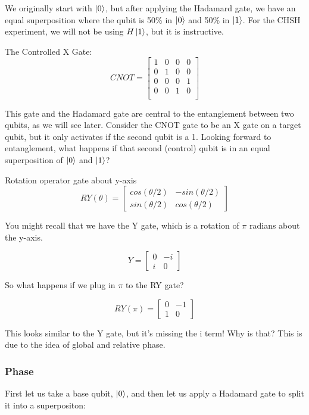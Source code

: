 \documentclass[12pt]{article}
\begin{document}
We originally start with $\ket{0}$, but after applying the Hadamard gate, we have an equal superposition where the qubit is 50\% in $\ket{0}$ and 50\% in $\ket{1}$. For the CHSH experiment, we will not be using $H\ket{1}$, but it is instructive. %


The Controlled X Gate:
$$
CNOT =
\begin{bmatrix}
1 &  0  &  0  & 0 \\
0 &  1  &  0  & 0 \\
0 &  0  &  0  & 1 \\
0 &  0  &  1  & 0 \\
\end{bmatrix}
$$

This gate and the Hadamard gate are central to the entanglement between two qubits, as we will see later. Consider the CNOT gate to be an X gate on a target qubit, but it only activates if the second qubit is a 1. Looking forward to entanglement, what happens if that second (control) qubit is in an equal superposition of $\ket{0}$ and $\ket{1}$?

Rotation operator gate about y-axis 
$$
RY(\theta) =
\begin{bmatrix}
cos(\theta / 2) & -sin(\theta / 2) \\
sin(\theta / 2) &  cos(\theta / 2)
\end{bmatrix}
$$

You might recall that we have the Y gate, which is a rotation of $\pi$ radians about the y-axis.

$$
Y = \begin{bmatrix}
0 & -i \\
i & 0
\end{bmatrix}
$$

So what happens if we plug in $\pi$ to the RY gate?

$$
RY(\pi) =
\begin{bmatrix}
0 & -1 \\
1 &  0
\end{bmatrix}
$$

This looks similar to the Y gate, but it's missing the i term! Why is that? This is due to the idea of global and relative phase.

\subsubsection{Phase}

First let us take a base qubit, $\ket{0}$, and then let us apply a Hadamard gate to split it into a superpositon:
\end{document}
